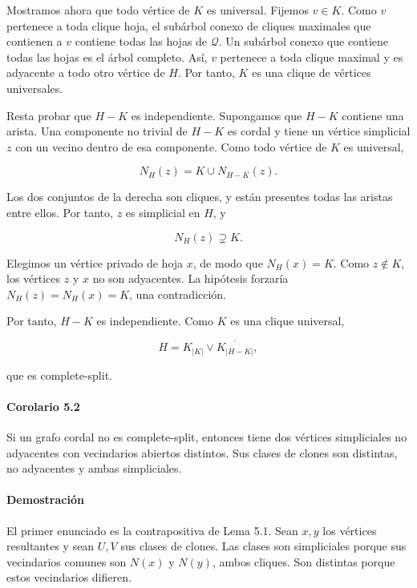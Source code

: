 \documentclass[
  spanish,
  11pt,
  a4paper,
]{article}
\begin{document}
Mostramos ahora que todo vértice de \(K\) es universal. Fijemos \(v\in K\). Como \(v\) pertenece a toda clique hoja, el subárbol conexo de cliques maximales que contienen a \(v\) contiene todas las hojas de \(\mathcal Q\). Un subárbol conexo que contiene todas las hojas es el árbol completo. Así, \(v\) pertenece a toda clique maximal y es adyacente a todo otro vértice de \(H\). Por tanto, \(K\) es una clique de vértices universales.

Resta probar que \(H-K\) es independiente. Supongamos que \(H-K\) contiene una arista. Una componente no trivial de \(H-K\) es cordal y tiene un vértice simplicial \(z\) con un vecino dentro de esa componente. Como todo vértice de \(K\) es universal,

\[
N_H(z)=K\cup N_{H-K}(z).
\]

Los dos conjuntos de la derecha son cliques, y están presentes todas las aristas entre ellos. Por tanto, \(z\) es simplicial en \(H\), y

\[
N_H(z)\supsetneq K.
\]

Elegimos un vértice privado de hoja \(x\), de modo que \(N_H(x)=K\). Como \(z\notin K\), los vértices \(z\) y \(x\) no son adyacentes. La hipótesis forzaría \(N_H(z)=N_H(x)=K\), una contradicción.

Por tanto, \(H-K\) es independiente. Como \(K\) es una clique universal,

\[
H=K_{|K|}\vee\overline{K_{|H-K|}},
\]

que es complete-split.

\paragraph{Corolario 5.2}\label{corolario-5.2}

Si un grafo cordal no es complete-split, entonces tiene dos vértices simpliciales no adyacentes con vecindarios abiertos distintos. Sus clases de clones son distintas, no adyacentes y ambas simpliciales.

\paragraph{Demostración}\label{demostraciuxf3n-6}

El primer enunciado es la contrapositiva de Lema 5.1. Sean \(x,y\) los vértices resultantes y sean \(U,V\) sus clases de clones. Las clases son simpliciales porque sus vecindarios comunes son \(N(x)\) y \(N(y)\), ambos cliques. Son distintas porque estos vecindarios difieren.
\end{document}
